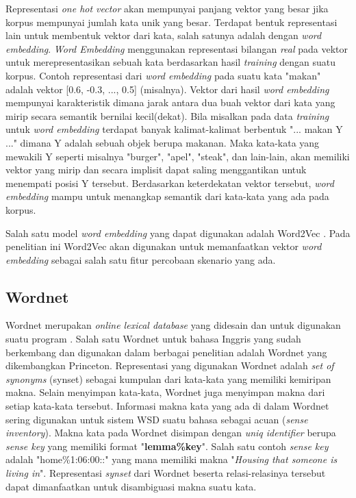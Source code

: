 Representasi \textit{one hot vector} akan mempunyai panjang vektor yang besar jika korpus mempunyai jumlah kata unik yang besar. Terdapat bentuk representasi lain untuk membentuk vektor dari kata, salah satunya adalah dengan \textit{word embedding}. \textit{Word Embedding} menggunakan representasi bilangan \textit{real} pada vektor untuk merepresentasikan sebuah kata berdasarkan hasil \textit{training} dengan suatu korpus. Contoh representasi dari \textit{word embedding} pada suatu kata "makan" adalah vektor [0.6, -0.3, ..., 0.5] (misalnya). Vektor dari hasil \textit{word embedding} mempunyai karakteristik dimana jarak antara dua buah vektor dari kata yang mirip secara semantik bernilai kecil(dekat). Bila misalkan pada data \textit{training} untuk \textit{word embedding} terdapat banyak kalimat-kalimat berbentuk "... makan Y ..." dimana Y adalah sebuah objek berupa makanan. Maka kata-kata yang mewakili Y seperti misalnya "burger", "apel", "steak", dan lain-lain, akan memiliki vektor yang mirip dan secara implisit dapat saling menggantikan untuk menempati posisi Y tersebut. Berdasarkan keterdekatan vektor tersebut, \textit{word embedding} mampu untuk menangkap semantik dari kata-kata yang ada pada korpus.

Salah satu model \textit{word embedding} yang dapat digunakan adalah Word2Vec \citep{mikolov2013distributed}. Pada penelitian ini Word2Vec akan digunakan untuk memanfaatkan vektor \textit{word embedding} sebagai salah satu fitur percobaan skenario yang ada. 

\subsection{Wordnet}

Wordnet merupakan \textit{online lexical database} yang didesain dan untuk digunakan suatu program \citep{miller1995wordnet}. Salah satu Wordnet untuk bahasa Inggris yang sudah berkembang dan digunakan dalam berbagai penelitian adalah Wordnet yang dikembangkan Princeton. Representasi yang digunakan Wordnet adalah \textit{set of synonyms} (synset) sebagai kumpulan dari kata-kata yang memiliki kemiripan makna. Selain menyimpan kata-kata, Wordnet juga menyimpan makna dari setiap kata-kata tersebut. Informasi makna kata yang ada di dalam Wordnet sering digunakan untuk sistem WSD suatu bahasa sebagai acuan (\textit{sense inventory}). Makna kata pada Wordnet disimpan dengan \textit{uniq identifier} berupa \textit{sense key} yang memiliki format "\textbf{lemma\%key}". Salah satu contoh \textit{sense key} adalah "home\%1:06:00::" yang mana memiliki makna "\textit{Housing that someone is living in}". Representasi \textit{synset} dari Wordnet beserta relasi-relasinya tersebut dapat dimanfaatkan untuk disambiguasi makna suatu kata.

